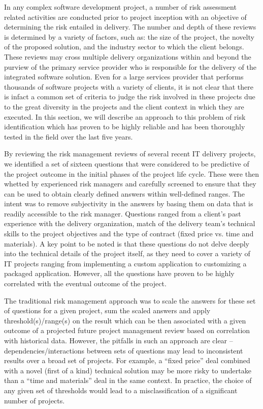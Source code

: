  In any complex software development project, a number of risk assessment related activities are conducted prior to project inception with an objective of determining the risk entailed in delivery. The number and depth of these reviews is determined by a variety of factors, such as: the size of the project, the novelty of the proposed solution, and the industry sector to which the client belongs. These reviews may cross multiple delivery organizations within and beyond the purview of the primary service provider who is responsible for the delivery of the integrated software solution. Even for a large services provider that performs thousands of software projects with a variety of clients, it is not clear that there is infact a common set of criteria to judge the risk involved in these projects due to the great diversity in the projects and the client context in which they are executed. In this section, we will describe an approach to this problem of risk identification which has proven to be highly reliable and has been thoroughly tested in the field over the last five years.

 By reviewing the risk management reviews of several recent IT delivery projects, we identified a set of sixteen questions that were considered to be predictive of the project outcome in the initial phases of the project life cycle. These were then whetted by experienced risk managers and carefully screened to ensure that they can be used to obtain clearly defined answers within well-defined ranges. The intent was to remove subjectivity in the answers by basing them on data that is readily accessible to the risk manager.  Questions ranged from a client's past experience with the delivery organization, match of the delivery team’s technical skills to the project objectives and the type of contract (fixed price vs. time and materials).  A key point to be noted is that these questions do not delve deeply into the technical details of the project itself, as they need to cover a variety of IT projects ranging from implementing a custom application to customizing a packaged application. However, all the questions have proven to be highly correlated with the eventual outcome of the project.

 The traditional risk management approach was to scale the answers for these set of questions for a given project, sum the scaled answers and apply threshold(s)/range(s) on the result which can be then associated with a given outcome of a projected future project management review based on correlation with historical data. However, the pitfalls in such an approach are clear – dependencies/interactions between sets of questions may lead to inconsistent results over a broad set of projects. For example, a “fixed price” deal combined with a novel (first of a kind) technical solution may be more risky to undertake than a “time and materials” deal in the same context. In practice, the choice of any given set of thresholds would lead to a misclassification of a significant number of projects.


